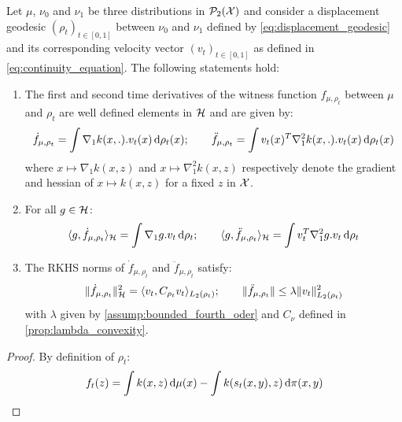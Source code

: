 \begin{lemma}\label{lem:derivatives_witness}
	Let  $\mu$, $\nu_0$ and $\nu_1$ be three distributions in $\mathcal{P}_2({{\mathcal X}})$ and consider a displacement geodesic $(\rho_t)_{t\in[0,1]}$ between $\nu_0$ and $\nu_1$  defined by \cref{eq:displacement_geodesic} 
	and its corresponding velocity vector $(v_t)_{t\in [0,1]}$ as defined in \cref{eq:continuity_equation}. The following statements hold:
	\begin{enumerate}
		\item The first and second time derivatives of the witness function $f_{\mu,\rho_t}$ between $\mu$ and $\rho_t$ are well defined elements in $ {{\mathcal H}}$ and are given by:
		\begin{align}\label{eq:derivatives_witness}
		\dot{f}_{\mu,\rho_t} = \int \nabla_1 k(x,.).v_t(x) \mathop{}\!\mathrm{d} \rho_t(x); \qquad
		\ddot{f}_{\mu,\rho_t} = \int v_t(x)^T\nabla_1^2 k(x,.).v_t(x) \mathop{}\!\mathrm{d} \rho_t(x)
		\end{align}
		where $ x \mapsto \nabla_1 k(x,z)$ and $x\mapsto \nabla_1^2 k(x,z)$ respectively denote the gradient and hessian of $x\mapsto k(x,z)$ for a fixed $z$ in ${{\mathcal X}}$.
		\item For all $g\in {{\mathcal H}}$:
		\begin{align}\label{eq:inner_prod_deriative_witness}
		\langle g,\dot{f}_{\mu,\rho_t}\rangle_{{{\mathcal H}}} = \int \nabla_1 g.v_t \mathop{}\!\mathrm{d} \rho_t; \qquad
		\langle g,  \ddot{f}_{\mu,\rho_t}\rangle_{{{\mathcal H}}} = \int v_t^T\nabla_1^2 g.v_t \mathop{}\!\mathrm{d} \rho_t
		\end{align}
		\item The RKHS norms of $\dot{f}_{\mu,\rho_t}$ and $\ddot{f}_{\mu,\rho_t}$ satisfy:
		\begin{align}\label{eq:norm_derivative_witness}
		\Vert \dot{f}_{\mu,\rho_t}\Vert_{{{\mathcal H}}}^2 = \langle v_t,C_{\rho_t} v_t \rangle_{L_2(\rho_t)}; \qquad  \Vert \ddot{f}_{\mu,\rho_t} \Vert\leq \lambda \Vert v_t \Vert^2_{L_2(\rho_t)}  
		\end{align}
		with $\lambda$ given by \cref{assump:bounded_fourth_oder} and $C_{\nu}$ defined in \cref{prop:lambda_convexity}. 
	\end{enumerate} 
\end{lemma}
\begin{proof}
	By definition of $\rho_{t}$:
	\[
	f_t(z)= \int k(x,z)\mathop{}\!\mathrm{d} \mu(x) - \int k(s_t(x,y),z)\mathop{}\!\mathrm{d} \pi(x,y)
	\]
\end{proof}


